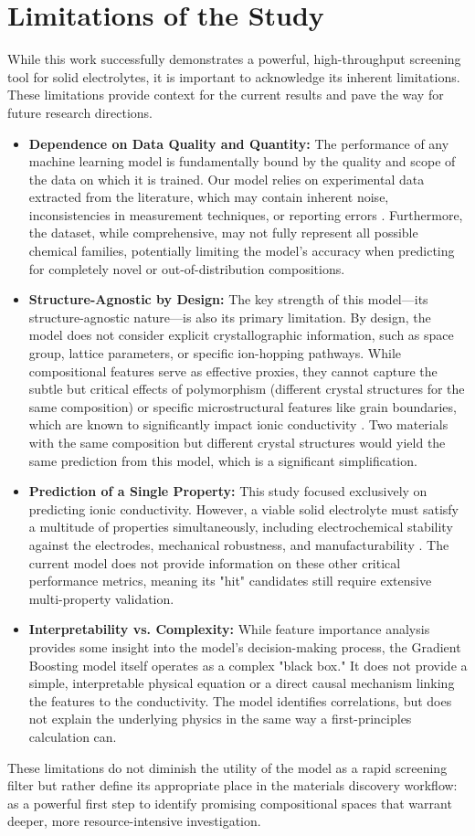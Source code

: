 \section{Limitations of the Study}

While this work successfully demonstrates a powerful, high-throughput screening tool for solid electrolytes, it is important to acknowledge its inherent limitations. These limitations provide context for the current results and pave the way for future research directions.

\begin{itemize}
    \item \textbf{Dependence on Data Quality and Quantity:} The performance of any machine learning model is fundamentally bound by the quality and scope of the data on which it is trained. Our model relies on experimental data extracted from the literature, which may contain inherent noise, inconsistencies in measurement techniques, or reporting errors \cite{DDSE2021}. Furthermore, the dataset, while comprehensive, may not fully represent all possible chemical families, potentially limiting the model's accuracy when predicting for completely novel or out-of-distribution compositions.

    \item \textbf{Structure-Agnostic by Design:} The key strength of this model—its structure-agnostic nature—is also its primary limitation. By design, the model does not consider explicit crystallographic information, such as space group, lattice parameters, or specific ion-hopping pathways. While compositional features serve as effective proxies, they cannot capture the subtle but critical effects of polymorphism (different crystal structures for the same composition) or specific microstructural features like grain boundaries, which are known to significantly impact ionic conductivity \cite{Famprikis2019, Janek2016}. Two materials with the same composition but different crystal structures would yield the same prediction from this model, which is a significant simplification.

    \item \textbf{Prediction of a Single Property:} This study focused exclusively on predicting ionic conductivity. However, a viable solid electrolyte must satisfy a multitude of properties simultaneously, including electrochemical stability against the electrodes, mechanical robustness, and manufacturability \cite{Manthiram2017}. The current model does not provide information on these other critical performance metrics, meaning its "hit" candidates still require extensive multi-property validation.

    \item \textbf{Interpretability vs. Complexity:} While feature importance analysis provides some insight into the model's decision-making process, the Gradient Boosting model itself operates as a complex "black box." It does not provide a simple, interpretable physical equation or a direct causal mechanism linking the features to the conductivity. The model identifies correlations, but does not explain the underlying physics in the same way a first-principles calculation can.
\end{itemize}

These limitations do not diminish the utility of the model as a rapid screening filter but rather define its appropriate place in the materials discovery workflow: as a powerful first step to identify promising compositional spaces that warrant deeper, more resource-intensive investigation.
